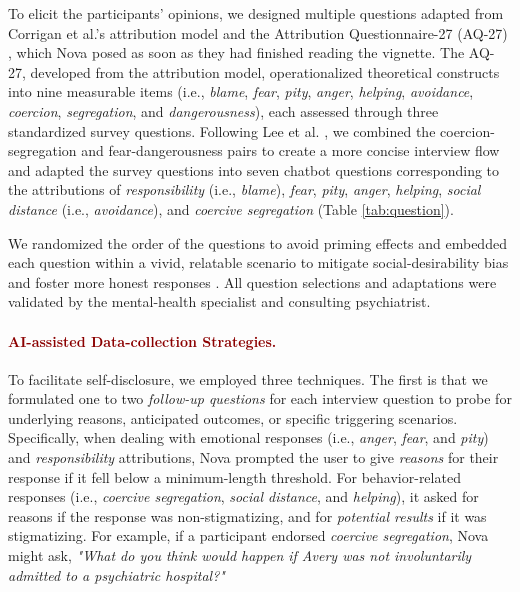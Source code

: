 To elicit the participants' opinions, we designed multiple questions adapted from Corrigan et al.'s attribution model \cite{attribution_model_corrigan_2003} and the Attribution Questionnaire-27 (AQ-27) \cite{aq27_corrigan_2012}, which Nova posed as soon as they had finished reading the vignette. 
The AQ-27, developed from the attribution model, operationalized theoretical constructs into nine measurable items (i.e., \textit{blame}, \textit{fear}, \textit{pity}, \textit{anger}, \textit{helping}, \textit{avoidance}, \textit{coercion}, \textit{segregation}, and \textit{dangerousness}), each assessed through three standardized survey questions.
Following Lee et al. \cite{chatbot_aq27_practice_lee_2023}, we combined the coercion-segregation and fear-dangerousness pairs to create a more concise interview flow and adapted the survey questions into seven chatbot questions corresponding to the attributions of \textit{responsibility} (i.e., \textit{blame}), \textit{fear}, \textit{pity}, \textit{anger}, \textit{helping}, \textit{social distance} (i.e., \textit{avoidance}), and \textit{coercive segregation} (Table \ref{tab:question}).

We randomized the order of the questions to avoid priming effects \cite{priming_effect_molden_2014} and embedded each question within a vivid, relatable scenario to mitigate social-desirability bias and foster more honest responses \cite{sd_indirect_q_fisher_1993}.
All question selections and adaptations were validated by the mental-health specialist and consulting psychiatrist.



\paragraph{\textcolor{darkred}{\textbf{AI-assisted Data-collection Strategies.}}}

To facilitate self-disclosure, we employed three techniques. 
The first is that we formulated one to two \textit{follow-up questions} \cite{follow_up_q_han_2021} for each interview question to probe for underlying reasons, anticipated outcomes, or specific triggering scenarios.
Specifically, when dealing with emotional responses (i.e., \textit{anger}, \textit{fear}, and \textit{pity}) and \textit{responsibility} attributions, Nova prompted the user to give \textit{reasons} for their response if it fell below a minimum-length threshold. 
For behavior-related responses (i.e., \textit{coercive segregation}, \textit{social distance}, and \textit{helping}), it asked for reasons if the response was non-stigmatizing, and for \textit{potential results} if it was stigmatizing. 
For example, if a participant endorsed \textit{coercive segregation}, Nova might ask, \textit{"What do you think would happen if Avery was not involuntarily admitted to a psychiatric hospital?"} 

